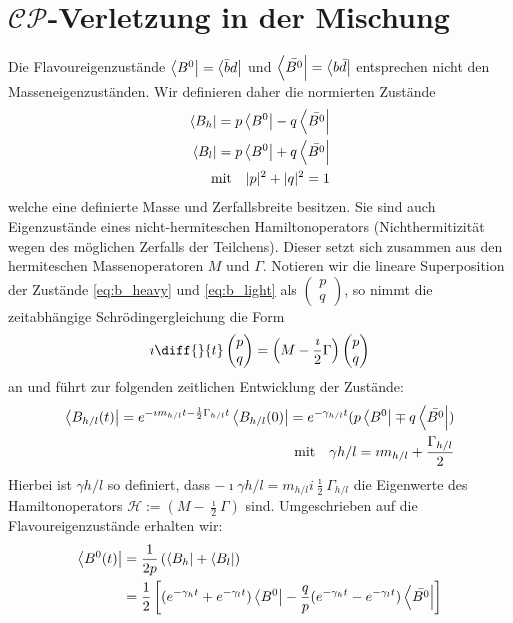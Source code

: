 \documentclass[a4paper]{scrbook}
\newcommand{\CP}{$\mathcal{CP}$}
\begin{document}
\section{\CP-Verletzung in der Mischung}
Die Flavoureigenzustände $\Bra{B^0} = \Bra{\bar{b}d}$ und $\Bra{\bar{B^0}} = \Bra{b\bar{d}}$ entsprechen nicht den Masseneigenzuständen. Wir definieren daher die normierten Zustände
\begin{align}
\Bra{B_h} = p \Bra{B^0} - q \Bra{\bar{B^0}} \label{eq:b_heavy}\\ 
\Bra{B_l} = p \Bra{B^0} + q \Bra{\bar{B^0}} \label{eq:b_light}\\
\text{mit} \quad |p|^2 + |q|^2 = 1
\end{align}
welche eine definierte Masse und Zerfallsbreite besitzen. Sie sind auch Eigenzustände eines nicht-hermiteschen Hamiltonoperators (Nichthermitizität wegen des möglichen Zerfalls der Teilchens). Dieser setzt sich zusammen aus den hermiteschen Massenoperatoren $M$ und $\Gamma$. Notieren wir die lineare Superposition der Zustände \ref{eq:b_heavy} und \ref{eq:b_light} als $\begin{pmatrix} p \\ q \end{pmatrix}$, so nimmt die zeitabhängige Schrödingergleichung die Form
\begin{align}
\imath \diff{}{t}\begin{pmatrix} p \\ q \end{pmatrix} = \left(M - \frac{\imath}{2} \Gamma\right) \begin{pmatrix} p \\ q \end{pmatrix}
\end{align}
an und führt zur folgenden zeitlichen Entwicklung der Zustände:
\begin{align}
\Bra{B_{h/l}(t)} = e^{-\imath m_{h/l}t-\frac{1}{2}\Gamma_{h/l}t}\Bra{B_{h/l}(0)} = e^{-\gamma_{h/l}t}(p\Bra{B^0} \mp q\Bra{\bar{B^0}}) \\
\text{mit} \quad \gamma{h/l} = \imath m_{h/l}+\frac{\Gamma_{h/l}}{2}
\end{align}
Hierbei ist $\gamma{h/l}$ so definiert, dass $-\imath\gamma{h/l} = m_{h/l}i\frac{\imath}{2}\Gamma_{h/l}$ die Eigenwerte des Hamiltonoperators $\mathcal{H} := \left(M - \frac{\imath}{2} \Gamma\right)$ sind. Umgeschrieben auf die Flavoureigenzustände erhalten wir:
\begin{align}
\nonumber \Bra{B^0(t)} &= \frac{1}{2p}\left(\Bra{B_h} + \Bra{B_l}\right) \\
                       &= \frac{1}{2}\left[ (e^{-\gamma_h t}+e^{-\gamma_l t})\Bra{B^0} - \frac{q}{p}(e^{-\gamma_h t}-e^{-\gamma_l t})\Bra{\bar{B^0}}\right] 
\end{align}
\end{document}
